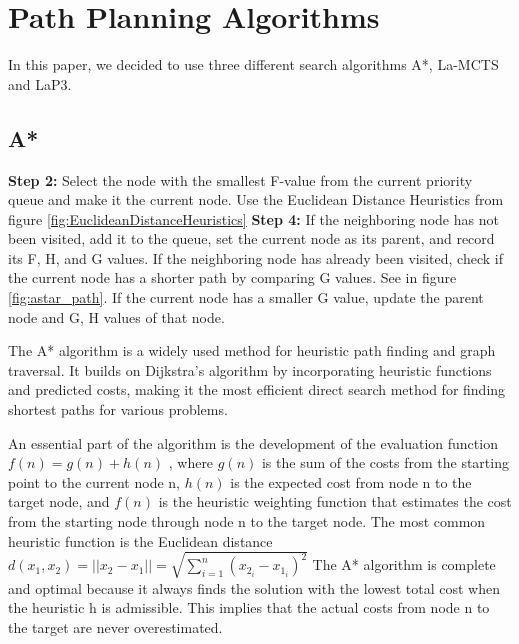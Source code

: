 \documentclass[bibliography=totoc]{scrartcl}
\begin{document}
\section{Path Planning Algorithms}
\label{path_planning_algorithm}
In this paper, we decided to use three different search algorithms A*, \ac{La-MCTS} and \ac{LaP3}.

\subsection{A*}
\textbf{Step 2:} Select the node with the smallest F-value from the current priority queue and make it the current node. Use the Euclidean Distance Heuristics from figure \ref{fig:EuclideanDistanceHeuristics}
\textbf{Step 4:} If the neighboring node has not been visited, add it to the queue, set the current node as its parent, and record its F, H, and G values. 
If the neighboring node has already been visited, check if the current node has a shorter path by comparing G values. See in figure \ref{fig:astar_path}.
If the current node has a smaller G value, update the parent node and G, H values of that node.

The A* algorithm is a widely used method for heuristic path finding and graph traversal. \cite{4082128} \cite{ProbabilisticApproachCollaborativeMultiRobotLocalization}
It builds on Dijkstra's algorithm by incorporating heuristic functions and predicted costs, making it the most efficient direct search method for finding shortest paths for various problems.\cite{ProbabilisticApproachCollaborativeMultiRobotLocalization}

An essential part of the algorithm is the development of the evaluation function $f(n) = g(n) + h(n)$ \cite[p. 121]{GrundkursKuenstlicheIntelligenz}, where $g(n)$ is the sum of the costs from the starting point to the current node n, $h(n)$ is the expected cost from node n to the target node, and $f(n)$ is the heuristic weighting function that estimates the cost from the starting node through node n to the target node.
The most common heuristic function is the Euclidean distance $d \left( x_1,x_2\right) = ||x_2- x_1|| =\sqrt {\sum _{i=1}^{n} \left( x_{2_i}-x_{1_i}\right)^2 } $
The A* algorithm is complete and optimal because it always finds the solution with the lowest total cost when the heuristic h is admissible.\cite[p. 121]{GrundkursKuenstlicheIntelligenz}
This implies that the actual costs from node n to the target are never overestimated.
\end{document}
